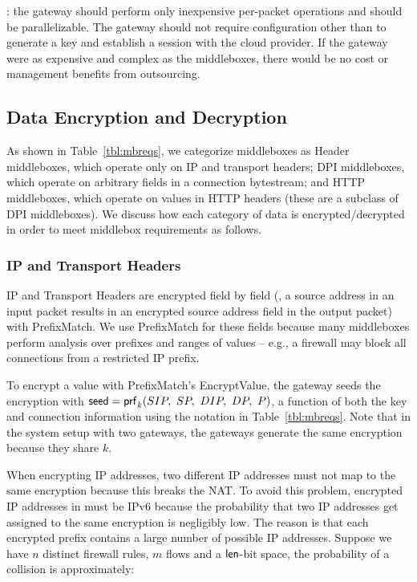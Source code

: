 : the gateway should perform only inexpensive per-packet operations and should be parallelizable. The gateway should not require configuration other than to generate a key and establish a session with the cloud provider. If the gateway were as expensive and complex as the middleboxes, there would be no cost or management benefits from outsourcing. 


\subsection{Data Encryption and Decryption}
\label{sec:dataenc}

As shown in Table~\ref{tbl:mbreqs}, we categorize middleboxes as Header middleboxes, which operate only on IP and transport headers; DPI middleboxes, which operate on arbitrary fields in a connection bytestream; and HTTP middleboxes, which operate on values in HTTP headers (these are a subclass of DPI middleboxes). We discuss how each category of data is encrypted/decrypted in order to meet middlebox requirements as follows.

\subsubsection{IP and Transport Headers}
IP and Transport Headers are encrypted field by field (\eg{}, a source address in an input packet results in an encrypted source address field in the output packet) with PrefixMatch.
We use PrefixMatch for these fields because many middleboxes perform analysis over prefixes and ranges of values -- e.g., a firewall may block all connections from a restricted IP prefix.


To encrypt a value with PrefixMatch's EncryptValue, the gateway seeds the encryption with  $\seed = \prf_k(SIP,\ SP,\ DIP,\ DP,\ P)$, a function of both the key and connection information using the notation in Table~\ref{tbl:mbreqs}. Note that in the system setup with two gateways, the gateways generate the same encryption because they share $k$.  


When encrypting IP addresses,  two different IP addresses must not map to the same encryption because this breaks the NAT. To avoid this problem, encrypted IP addresses in \sys must be IPv6 because the probability that two IP addresses get assigned to the same encryption is negligibly low. The reason is that each encrypted prefix contains a large number of possible IP addresses. Suppose we have $n$ distinct firewall rules, $m$ flows and a $\mathsf{len}$-bit space, the probability of a collision is approximately: 

